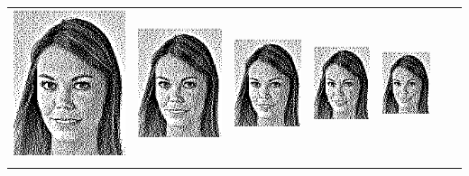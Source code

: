 \begin{tabular}{lllllll}
	\includegraphics{Ediphoto-2-3.png} &
	\includegraphics{Ediphoto-2-4.png} &
	\includegraphics{Ediphoto-2-5.png} &
	\includegraphics{Ediphoto-2-6.png} &
	\includegraphics{Ediphoto-2-7.png} \\
	 &
	 &
	 &
	 &
	 &
	 &
	 \\
\end{tabular}

